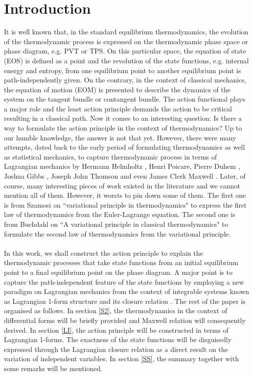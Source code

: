 \documentclass[12pt]{article}
\numberwithin{equation}{section}
\theoremstyle{remark}
\theoremstyle{definition}
\begin{document}
	\section{Introduction}\label{S1}
	It is well known that, in the standard equilibrium thermodynamics, the evolution of the thermodynamic process is expressed on the thermodynamic phase space or phase diagram, e.g. PVT or TPS. On this particular space, the equation of state (EOS) is defined as a point and the revolution of the state functions, e.g. internal energy and entropy, from one equilibrium point to another equilibrium point is path-independently given. On the contrary, in the context of classical mechanics, the equation of motion (EOM) is presented to describe the dynamics of the system on the tangent bundle or contangent bundle. The action functional plays a major role and the least action principle demands the action to be critical resulting in a classical path. Now it comes to an interesting question: Is there a way to formulate the action principle in the context of thermodynamics? Up to our humble knowledge, the answer is not that yet. However, there were many attempts, dated back to the early period of formulating thermodynamics as well as statistical mechanics, to capture thermodynamic process in terms of Lagrangian mechanics by Hermann Helmholtz \cite{Helm1,Helm2}, Henri Poicare, Pierre Duhem \cite{D1,D2,D3,D4,D5}, Joshua Gibbs \cite{Gibbs1,Gibbs2,Gibbs3}, Joseph John Thomson \cite{Thomson} and even James Clerk Maxwell \cite{M1,M2}. Later, of course, many interesting pieces of work existed in the literature and we cannot mention all of them. However, it worsts to pin down some of them. The first one is from Szamosi on ``variational principle in thermodynamics" \cite{GS} to express the first law of thermodynamics from the Euler-Lagrange equation. The second one is from Buchdahl on ``A variational principle in classical thermodynamics" \cite{B} to formulate the second law of thermodynamics from the variational principle.
 \\
 \\
 In this work, we shall construct the action principle to explain the thermodynamic processes that take state functions from an initial equilibrium point to a final equilibrium point on the phase diagram. A major point is to capture the path-independent feature of the state functions by employing a new paradigm on Lagrangian mechanics from the context of integrable systems known as Lagrangian 1-form structure and its closure relation \cite{Frank}. The rest of the paper is organised as follows. In section \ref{S2}, the thermodynamics in the context of differential forms will be briefly provided and Maxwell relation will consequently derived. In section \ref{LI}, the action principle will be constructed in terms of Lagrangian 1-forms. The exactness of the state functions will be disguisedly expressed through the Lagrangian closure relation as a direct result on the variation of independent variables. In section \ref{SS}, the summary together with some remarks will be mentioned.
\end{document}
